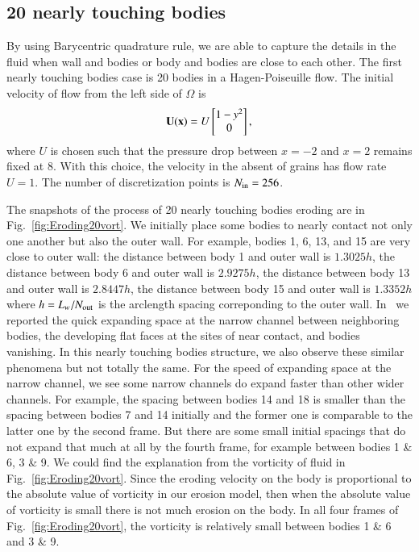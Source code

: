 \documentclass[preprint, 10pt]{elsarticle}
\begin{document}
\subsection{20 nearly touching bodies}
{\color{red} 
By using Barycentric quadrature rule, 
we are able to capture the details in the fluid when wall 
and bodies or body and bodies are close to each other. 
The first nearly touching bodies case is 20 bodies in a Hagen-Poiseuille flow. 
The initial velocity of flow from the left side of $\Omega$ is 
$${\mathbf{U}}({\mathbf{x}})=U\begin{bmatrix} 1-y^2\\ 0\end{bmatrix},$$ 
where $U$ is chosen such that 
the pressure drop between  $x=-2$ and $x=2$ remains fixed at 8.
With this choice, the velocity in the absent of grains has flow rate $U=1$.
The number of discretization points is $N_{\mathrm{in}} = 256$.

The snapshots of the process of 20 nearly touching bodies 
eroding are in Fig.~\ref{fig:Eroding20vort}. 
We initially place some bodies to nearly contact not only one another 
but also the outer wall. For example, bodies 1, 6, 13, and 15 
are very close to outer wall: 
the distance between body 1 and outer wall is $1.3025h$, 
the distance between body 6 and outer wall is $2.9275h$,
the distance between body 13 and outer wall is $2.8447h$,
the distance between body 15 and outer wall is $1.3352h$ 
where $h=L_w/N_{\mathrm{out}}$ is the arclength spacing correponding to the outer wall.
 In~\cite{qua-moo2018} 
we reported the quick expanding space at the narrow channel 
between neighboring bodies, the developing flat faces at the sites 
of near contact, and bodies vanishing. In this nearly touching bodies 
structure, we also observe these similar phenomena but not totally the same.
For the speed of expanding space at the narrow channel, we see some 
narrow channels do expand faster than other wider channels. 
For example, the spacing between bodies 14 and 18 is smaller 
than the spacing between bodies 7 and 14 initially and the former one is 
comparable to the latter one by the second frame. But there are some 
small initial spacings that do not expand that much at all by the fourth frame, 
for example between bodies 1 \& 6, 3 \& 9. 
We could find the explanation from the vorticity of fluid 
in Fig.~\ref{fig:Eroding20vort}. 
Since the eroding velocity on the body is proportional to the 
absolute value of vorticity in our erosion model,  
then when the  absolute value of vorticity is small 
there is not much erosion on the body. 
In all four frames of Fig.~\ref{fig:Eroding20vort}, 
the vorticity is relatively small between bodies 1 \& 6 and 3 \& 9.

}
\end{document}
